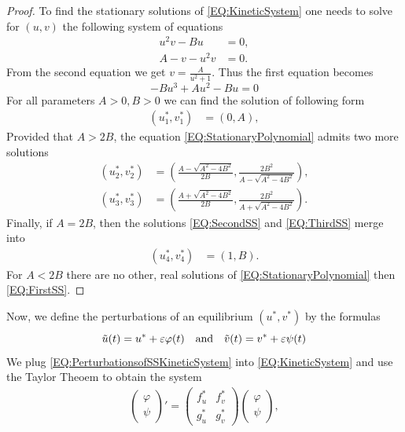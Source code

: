 \documentclass[12pt, a4paper]{article}
\theoremstyle{break}
\theoremstyle{break}
\theoremstyle{break}
\theoremstyle{break}
\theoremstyle{break}
\theoremstyle{break}
\theoremstyle{break}
\begin{document}
\begin{proof}
    To find the stationary solutions of \eqref{EQ:KineticSystem} one needs to solve for $(u, v)$ the following system of equations
    \begin{align*}
        u^2 v - Bu &= 0 ,\\
        A - v - u^2 v &= 0.
    \end{align*}
    From the second equation we get $v = \frac{A}{u^2 + 1}$. Thus the first equation becomes
    \begin{equation}
        \label{EQ:StationaryPolynomial}
        -B u^3 + A u^2 - B u = 0
    \end{equation}
    For all parameters $A > 0, B > 0$ we can find the solution of following form
    \begin{align}
        \label{EQ:FirstSS}
        \left(u_1^*, v_1^*\right) &= \left(0, A\right),
    \end{align}
    Provided that $A > 2B$, the equation \eqref{EQ:StationaryPolynomial} admits two more solutions
    \begin{align}
        \left(u_2^*, v_2^*\right) &= \left(\frac{A - \sqrt{A^2 - 4B^2}}{2B}, \frac{2 B^2}{A - \sqrt{A^2 - 4B^2}}\right), \label{EQ:SecondSS}\\
        \left(u_3^*, v_3^*\right) &= \left(\frac{A + \sqrt{A^2 - 4B^2}}{2B}, \frac{2 B^2}{A + \sqrt{A^2 - 4B^2}}\right) \label{EQ:ThirdSS}.
    \end{align}
    Finally, if $A = 2B$, then the solutions \eqref{EQ:SecondSS} and \eqref{EQ:ThirdSS} merge into 
    \begin{align}
        \label{EQ:FourthSS}
        \left( u_4^*, v_4^* \right) &= \left(1, B\right).
    \end{align}
    For $A < 2B$ there are no other, real solutions of \eqref{EQ:StationaryPolynomial} then \eqref{EQ:FirstSS}.
\end{proof}
Now, we define the perturbations of an equilibrium $(u^*, v^*)$ by the formulas
\begin{equation}
    \label{EQ:PerturbationsofSSKineticSystem}
    \Tilde{u}(t) = u^* + \varepsilon \varphi(t) \quad \text{and} \quad \Tilde{v}(t) = v^* + \varepsilon \psi(t) 
\end{equation}
We plug \eqref{EQ:PerturbationsofSSKineticSystem} into \eqref{EQ:KineticSystem} and use the Taylor Theoem to obtain the system
\begin{align}
    \label{EQ:LinearizedKineticSystem}
    \begin{pmatrix}
        \varphi \\ \psi
    \end{pmatrix} ' 
    = 
    \begin{pmatrix}
        f_u^* & f_v^* \\ g_u^* & g_v^*
    \end{pmatrix}
    \begin{pmatrix}
        \varphi \\ \psi
    \end{pmatrix},
\end{align}
\end{document}
